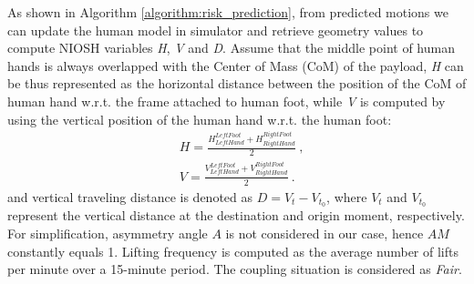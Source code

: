 As shown in Algorithm \ref{algorithm:risk_prediction}, from predicted motions we can update the human model in simulator and retrieve geometry values to compute NIOSH variables \emph{H}, \emph{V} and \emph{D}. Assume that the middle point of human hands is always overlapped with the Center of Mass (CoM) of the payload, \emph{H} can be thus represented as the horizontal distance between the position of the CoM of human hand w.r.t. the frame attached to human foot, while \emph{V} is computed by using the vertical position of the human hand w.r.t. the human foot:
\begin{subequations}
\begin{align} \label{eqa_H}
& H = \frac{H_{LeftHand}^{LeftFoot} + H_{RightHand}^{RightFoot}}{2} ~,\\
\label{eqa_V}
& V = \frac{V_{LeftHand}^{LeftFoot} + V_{RightHand}^{RightFoot}}{2} ~.
\end{align}
\end{subequations}
and vertical traveling distance is denoted as \(D = V_t - V_{t_0}\),  where $V_t$  and $V_{t_0}$ represent the vertical distance at the destination and origin moment, respectively. For simplification, asymmetry angle $A$ is not considered in our case, hence $AM$ constantly equals 1. Lifting frequency is computed as the average number of lifts per minute over a 15-minute period. The coupling situation is considered as \emph{Fair}.



